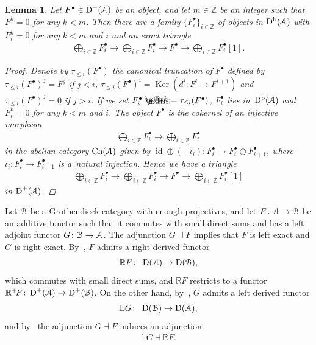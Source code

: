 \documentclass[pdftex]{sigma}%
\makeatletter
\newtheorem{lem}[dfn]{Lemma}
\newcommand*{\defeq}{\mathrel{\rlap{%
 \raisebox{0.3ex}{$\m@th\cdot$}}%
 \raisebox{-0.3ex}{$\m@th\cdot$}}%
 =}
\numberwithin{equation}{section}
\newcommand{\Ch}{\operatorname{Ch}}
\newcommand{\Db}{\operatorname{D^b}}
\newcommand{\D}{\operatorname{D}}
\newcommand{\id}{\operatorname{id}}
\newcommand{\Ker}{\operatorname{Ker}}
\newcommand{\bL}{\mathbb{L}}
\newcommand{\bR}{\mathbb{R}}
\newcommand{\bZ}{\mathbb{Z}}
\newcommand{\scrA}{\EuScript{A}}
\newcommand{\scrB}{\EuScript{B}}
\makeatother
\begin{document}
\begin{lem}\label{canonical truncation}
Let $F^{\bullet}\in \D^+(\scrA)$ be an object, and let $m\in \bZ$ be an integer such that $F^k=0$ for any $k<m$. Then there are a family $\{F^{\bullet}_i\}_{i\in \bZ}$ of objects in $\Db(\scrA)$ with $F^{k}_i=0$ for any $k<m$ and $i$ and an exact triangle
\begin{gather*}
\bigoplus_{i\in \bZ}F^{\bullet}_i\to \bigoplus_{i\in \bZ}F^{\bullet}_i\to F^{\bullet}\to \bigoplus_{i\in \bZ}F^{\bullet}_i[1].
\end{gather*}
\begin{proof}
Denote by $\tau_{\leq i}(F^{\bullet})$ the canonical truncation of $F^{\bullet}$ defined by $\tau_{\leq i}(F^{\bullet})^j=F^j$ if $j<i$, $\tau_{\leq i}(F^{\bullet})^i=\Ker(d^i\colon F^i\to F^{i+1})$ and $\tau_{\leq i}(F^{\bullet})^j=0$ if $j>i$. If we set $F_i^{\bullet}\defeq \tau_{\leq i}(F^{\bullet})$, $F_i^{\bullet}$ lies in~$\Db(\scrA)$ and $F^{k}_i=0$ for any $k<m$ and $i$. The object $F^{\bullet}$ is the cokernel of an injective morphism
\begin{gather*}
\bigoplus_{i\in \bZ} F^{\bullet}_i\to \bigoplus_{i\in \bZ} F^{\bullet}_i
\end{gather*}
in the abelian category $\Ch(\scrA)$ given by
 $\id \oplus (-\iota_i)\colon F^{\bullet}_i\to F^{\bullet}_i\oplus F^{\bullet}_{i+1}$, where $\iota_i\colon F^{\bullet}_i\to F^{\bullet}_{i+1}$ is a~natural injection. Hence we have a triangle
\begin{gather*}
\bigoplus_{i\in \bZ}F^{\bullet}_i\to \bigoplus_{i\in \bZ}F^{\bullet}_i\to F^{\bullet}\to \bigoplus_{i\in \bZ}F^{\bullet}_i[1]
\end{gather*}
in $\D^+(\scrA)$.
\end{proof}
\end{lem}

Let $\scrB$ be a Grothendieck category with enough projectives, and let $F\colon \scrA\to\scrB$ be an addi\-tive functor such that it commutes with small direct sums and has a left adjoint functor $G\colon \scrB\to \scrA$. The adjunction $G\dashv F$ implies that $F$ is left exact and $G$ is right exact. By~\cite[Proposition~14.3.4]{ks2}, $F$ admits a right derived functor
 \begin{gather*}
 \bR F\colon\ \D(\scrA)\to \D(\scrB),
 \end{gather*}
 which commutes with small direct sums, and $ \bR F$ restricts to a functor $\bR^+\!F\colon \D^+(\scrA)\to \D^+(\scrB)$. On the other hand, by~\cite[Theorem~14.4.3]{ks2}, $G$ admits a left derived functor
 \begin{gather*}
 \bL G\colon\ \D(\scrB)\to \D(\scrA),
 \end{gather*}
 and by~\cite[Theorem~14.4.5]{ks2} the adjunction $G\dashv F$ induces an adjunction
 \begin{gather*}
 \bL G\dashv \bR F.
 \end{gather*}
\end{document}
